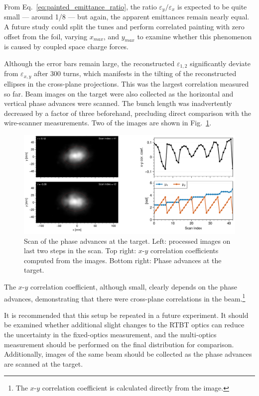 % 
From Eq.~\ref{eq:painted_emittance_ratio}, the ratio $\varepsilon_y / \varepsilon_x$ is expected to be quite small — around 1/8 — but again, the apparent emittances remain nearly equal. A future study could split the tunes and perform correlated painting with zero offset from the foil, varying $x_{max}$, and $y_{max}$ to examine whether this phenomenon is caused by coupled space charge forces.

Although the error bars remain large, the reconstructed $\varepsilon_{1,2}$ significantly deviate from $\varepsilon_{x,y}$ after 300 turns, which manifests in the tilting of the reconstructed ellipses in the cross-plane projections. This was the largest correlation measured so far. Beam images on the target were also collected as the horizontal and vertical phase advances were scanned. The bunch length was inadvertently decreased by a factor of three beforehand, precluding direct comparison with the wire-scanner measurements. Two of the images are shown in Fig.~\ref{fig:exp3_target_scan}. 
%
\begin{figure}[!p]
    \centering
    \includegraphics[width=\textwidth]{Images/chapter5/exp3/target_scan/target_scan.png}
    \caption{Scan of the phase advances at the target. Left: processed images on last two steps in the scan. Top right: $x$-$y$ correlation coefficients computed from the images. Bottom right: Phase advances at the target.}
    \label{fig:exp3_target_scan}
\end{figure}
%
The $x$-$y$ correlation coefficient, although small, clearly depends on the phase advances, demonstrating that there were cross-plane correlations in the beam.\footnote{The $x$-$y$ correlation coefficient is calculated directly from the image.}

It is recommended that this setup be repeated in a future experiment. It should be examined whether additional slight changes to the RTBT optics can reduce the uncertainty in the fixed-optics measurement, and the multi-optics measurement should be performed on the final distribution for comparison. Additionally, images of the same beam should be collected as the phase advances are scanned at the target.

